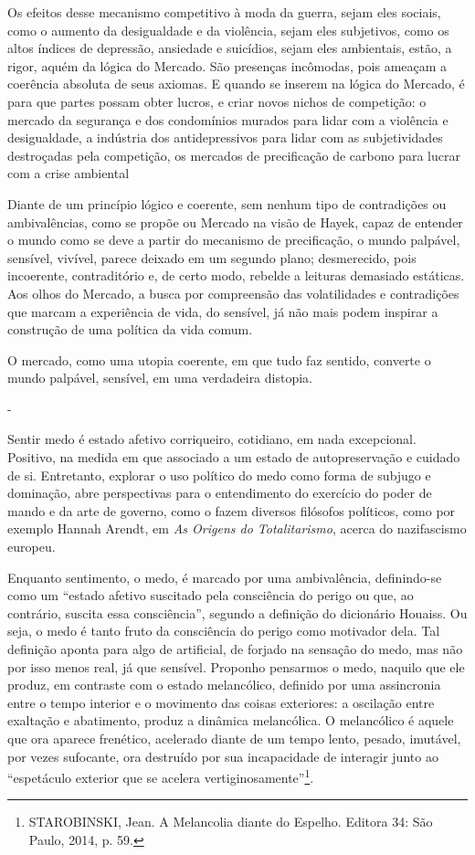 Os efeitos desse mecanismo competitivo à moda da guerra, sejam eles
sociais, como o aumento da desigualdade e da violência, sejam eles
subjetivos, como os altos índices de depressão, ansiedade e suicídios,
sejam eles ambientais, estão, a rigor, aquém da lógica do Mercado. São
presenças incômodas, pois ameaçam a coerência absoluta de seus axiomas.
E quando se inserem na lógica do Mercado, é para que partes possam obter
lucros, e criar novos nichos de competição: o mercado da segurança e dos
condomínios murados para lidar com a violência e desigualdade, a
indústria dos antidepressivos para lidar com as subjetividades
destroçadas pela competição, os mercados de precificação de carbono para
lucrar com a crise ambiental

Diante de um princípio lógico e coerente, sem nenhum tipo de
contradições ou ambivalências, como se propõe ou Mercado na visão de
Hayek, capaz de entender o mundo como se deve a partir do mecanismo de
precificação, o mundo palpável, sensível, vivível, parece deixado em um
segundo plano; desmerecido, pois incoerente, contraditório e, de certo
modo, rebelde a leituras demasiado estáticas. Aos olhos do Mercado, a
busca por compreensão das volatilidades e contradições que marcam a
experiência de vida, do sensível, já não mais podem inspirar a
construção de uma política da vida comum.

O mercado, como uma utopia coerente, em que tudo faz sentido, converte o
mundo palpável, sensível, em uma verdadeira distopia.

-

Sentir medo é estado afetivo corriqueiro, cotidiano, em nada
excepcional. Positivo, na medida em que associado a um estado de
autopreservação e cuidado de si. Entretanto, explorar o uso político do
medo como forma de subjugo e dominação, abre perspectivas para o
entendimento do exercício do poder de mando e da arte de governo, como o
fazem diversos filósofos políticos, como por exemplo Hannah Arendt, em
\emph{As Origens do Totalitarismo}, acerca do nazifascismo europeu.

Enquanto sentimento, o medo, é marcado por uma ambivalência,
definindo-se como um ``estado afetivo suscitado pela consciência do
perigo ou que, ao contrário, suscita essa consciência'', segundo a
definição do dicionário Houaiss. Ou seja, o medo é tanto fruto da
consciência do perigo como motivador dela. Tal definição aponta para
algo de artificial, de forjado na sensação do medo, mas não por isso
menos real, já que sensível. Proponho pensarmos o medo, naquilo que ele
produz, em contraste com o estado melancólico, definido por uma
assincronia entre o tempo interior e o movimento das coisas exteriores:
a oscilação entre exaltação e abatimento, produz a dinâmica melancólica.
O melancólico é aquele que ora aparece frenético, acelerado diante de um
tempo lento, pesado, imutável, por vezes sufocante, ora destruído por
sua incapacidade de interagir junto ao ``espetáculo exterior que se
acelera vertiginosamente''\footnote{STAROBINSKI, Jean. A Melancolia
  diante do Espelho. Editora 34: São Paulo, 2014, p. 59.}.

